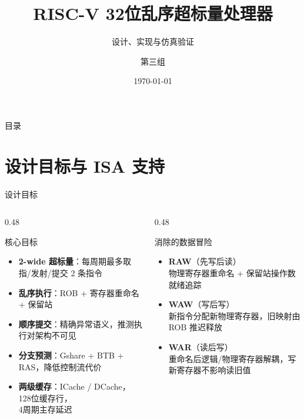 \documentclass[aspectratio=169,xcolor={dvipsnames,svgnames},10pt]{beamer}
\title{RISC-V 32位乱序超标量处理器}
\subtitle{设计、实现与仿真验证}
\author[第三组]{第三组}
\institute{铁人三项}
\date{\today}
\newcommand{\hl}[1]{\textcolor{AccentOrange}{\textbf{#1}}}
\begin{document}
\begin{frame}[plain]
  \titlepage
\end{frame}

\begin{frame}{目录}
  \tableofcontents[hideallsubsections]
\end{frame}

\section{设计目标与 ISA 支持}

\begin{frame}{设计目标}
  \begin{columns}[T]
    \begin{column}{0.48\textwidth}
      \begin{block}{核心目标}
        \begin{itemize}
          \item \hl{2-wide 超标量}：每周期最多取指/发射/提交 2 条指令
          \item \hl{乱序执行}：ROB + 寄存器重命名 + 保留站
          \item \hl{顺序提交}：精确异常语义，推测执行对架构不可见
          \item \hl{分支预测}：Gshare + BTB + RAS，降低控制流代价
          \item \hl{两级缓存}：ICache / DCache，128位缓存行，\\4周期主存延迟
        \end{itemize}
      \end{block}
    \end{column}
    \begin{column}{0.48\textwidth}
      \begin{block}{消除的数据冒险}
        \begin{itemize}
          \item \textbf{RAW}（先写后读）\\
                {\small 物理寄存器重命名 + 保留站操作数就绪追踪}
          \vspace{0.1cm}
          \item \textbf{WAW}（写后写）\\
                {\small 新指令分配新物理寄存器，旧映射由 ROB 推迟释放}
          \vspace{0.1cm}
          \item \textbf{WAR}（读后写）\\
                {\small 重命名后逻辑/物理寄存器解耦，写新寄存器不影响读旧值}
        \end{itemize}
      \end{block}
    \end{column}
  \end{columns}
\end{frame}
\end{document}

